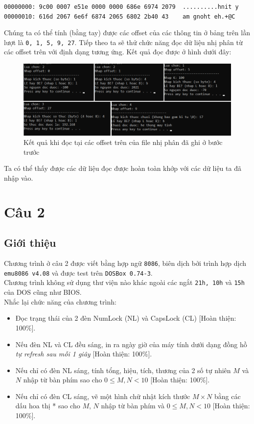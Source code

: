 \documentclass[12pt, final]{article}
\newcommand{\code}[1]{\texttt{#1}}
\begin{document}
\begin{verbatim}
00000000: 9c00 0007 e51e 0000 0000 686e 6974 2079  ..........hnit y
00000010: 616d 2067 6e6f 6874 2065 6802 2b40 43    am gnoht eh.+@C
\end{verbatim}

Chúng ta có thể tính (bằng tay) được các offset của các thông tin ở bảng trên lần lượt là \code{0, 1, 5, 9, 27}.
Tiếp theo ta sẽ thử chức năng đọc dữ liệu nhị phân từ các offset trên với định dạng tương ứng. Kết quả đọc được ở hình dưới đây:
\begin{figure}[H]
\centering
\includegraphics[width=\textwidth]{image/test.png}
\caption{Kết quả khi đọc tại các offset trên của file nhị phân đã ghi ở bước trước}
\end{figure}

Ta có thể thấy được các dữ liệu đọc được hoàn toàn khớp với các dữ liệu ta đã nhập vào.

\section{Câu 2}
\subsection{Giới thiệu}
Chương trình ở câu 2 được viết bằng hợp ngữ \code{8086}, biên dịch bởi trình hợp dịch \code{emu8086 v4.08} và được test trên \code{DOSBox 0.74-3}.\\
Chương trình không sử dụng thư viện nào khác ngoài các ngắt \code{21h, 10h} và \code{15h} của DOS cũng như BIOS.\\
Nhắc lại chức năng của chương trình:
\begin{itemize}
    \item Đọc trạng thái của 2 đèn NumLock (NL) và CapsLock (CL) [Hoàn thiện: 100\%].
    \item Nếu đèn NL và CL đều sáng, in ra ngày giờ của máy tính dưới dạng đồng hồ \textit{tự refresh sau mỗi 1 giây} [Hoàn thiện: 100\%].
    \item Nếu chỉ có đèn NL sáng, tính tổng, hiệu, tích, thương của 2 số tự nhiên $M$ và $N$ nhập từ bàn phím sao cho $0 \leq M, N < 10$ [Hoàn thiện: 100\%].
    \item Nếu chỉ có đèn CL sáng, vẽ một hình chữ nhật kích thước $M\times N$ bằng các dấu hoa thị * sao cho $M$, $N$ nhập từ bàn phím và $0 \leq M, N < 10$ [Hoàn thiện: 100\%]. 
\end{itemize}
\end{document}
